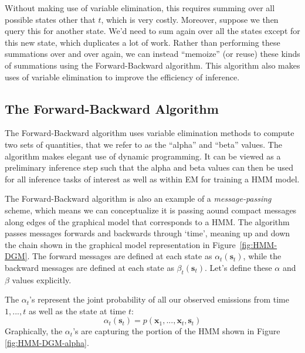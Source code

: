 Without making use of variable elimination, this requires summing over all possible states other that $t$, which is very costly.
%
Moreover, suppose we then query this for another state. We'd need to sum again over all the states except for this new state,
which duplicates a lot of work.
%
Rather than performing these summations over and over again, we can instead ``memoize'' (or reuse) these kinds of summations using the Forward-Backward algorithm. This  algorithm also makes uses of variable elimination to improve the efficiency of inference.

\subsection{ The Forward-Backward Algorithm}


The Forward-Backward algorithm uses variable elimination methods to compute two sets of quantities, that we refer to as the ``alpha'' and ``beta'' values. The algorithm makes elegant use of dynamic programming. It can be viewed as a preliminary inference step such that the alpha and beta values can then be used for all inference tasks of interest as well as within EM for training a HMM model.

The Forward-Backward algorithm is also an example of a \textit{message-passing} scheme, which means we can conceptualize it is passing aound compact messages along edges of the graphical model that corresponds to a HMM.
%
The algorithm passes messages  forwards and backwards through `time', meaning up and down the chain shown in the graphical model representation in Figure~\ref{fig:HMM-DGM}. The forward messages are defined at each state as $\alpha_t(\textbf{s}_t)$, while the backward messages are defined at each state as $\beta_t(\textbf{s}_t)$. Let's define these $\alpha$ and $\beta$ values explicitly.

The $\alpha_t$'s represent the joint probability of all our observed emissions from time $1,...,t$ as well as the state at time $t$:
%
\begin{equation} \label{unfactorized-alphas}
	\alpha_t(\textbf{s}_t) = p(\textbf{x}_1, ..., \textbf{x}_t, \textbf{s}_t)
\end{equation}
Graphically, the $\alpha_t$'s are capturing the portion of the HMM  shown in Figure \ref{fig:HMM-DGM-alpha}.


